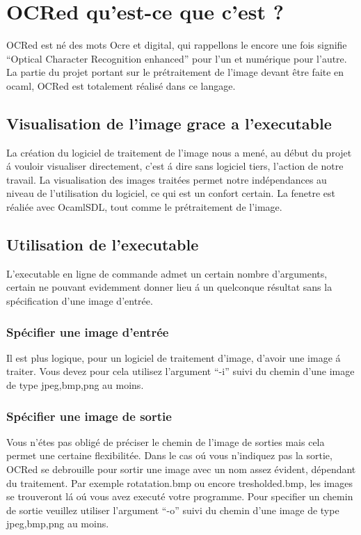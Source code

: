\chapter{ OCRed qu'est-ce que c'est ? }
 OCRed est n\'e des mots Ocre et digital, qui rappellons le encore une fois
 signifie ``Optical Character Recognition enhanced'' pour l'un et
 num\'erique pour l'autre. La partie du projet portant sur le
 pr\'etraitement de l'image devant \^etre faite en ocaml, OCRed est
 totalement r\'ealis\'e dans ce langage.

\section{ Visualisation de l'image grace a l'executable }
 La cr\'eation du logiciel de traitement de l'image nous a men\'e, au
 d\'ebut du projet \'a vouloir visualiser directement, c'est \'a dire
 sans logiciel tiers, l'action de notre travail.
 La visualisation des images trait\'ees permet notre ind\'ependances
 au niveau de l'utilisation du logiciel, ce qui est un confort certain.
 La fenetre est r\'eali\'ee avec OcamlSDL, tout comme le pr\'etraitement
 de l'image.

\section{ Utilisation de l'executable }
 L'executable en ligne de commande admet un certain nombre d'arguments,
 certain ne pouvant evidemment donner lieu \'a un quelconque r\'esultat
 sans la sp\'ecification d'une image d'entr\'ee.
\subsection{ Sp\'ecifier une image d'entr\'ee }
 Il est plus logique, pour un logiciel de traitement d'image, d'avoir
 une image \'a traiter. Vous devez pour cela utilisez l'argument ``-i''
 suivi du chemin d'une image de type jpeg,bmp,png au moins.
\subsection{ Sp\'ecifier une image de sortie }
 Vous n'\'etes pas oblig\'e de pr\'eciser le chemin de l'image de sorties
 mais cela permet une certaine flexibilit\'ee. Dans le cas o\'u vous
 n'indiquez pas la sortie, OCRed se debrouille pour sortir une image
 avec un nom assez \'evident, d\'ependant du traitement. Par exemple
 rotatation.bmp ou encore tresholded.bmp, les images se trouveront l\'a
 o\'u vous avez execut\'e votre programme. Pour specifier un chemin de
 sortie veuillez utiliser l'argument ``-o'' suivi du chemin d'une image
de type jpeg,bmp,png au moins.
